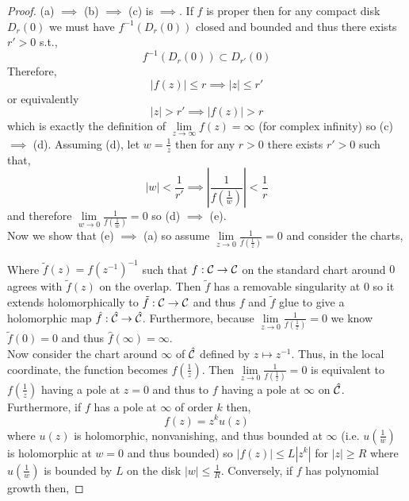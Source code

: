 \documentclass[12pt]{article}
\begin{document}
\begin{proof}
(a) $\implies$ (b) $\implies$ (c) is $\implies$. If $f$ is proper then for any compact disk $D_r(0)$ we must have $f^{-1}(D_r(0))$ closed and bounded and thus there exists $r' > 0$ s.t.,
\[ f^{-1}(D_r(0)) \subset D_{r'}(0) \]
Therefore,
\[ |f(z)| \le r \implies |z| \le r' \]
or equivalently
\[ |z| > r' \implies |f(z)| > r \]
which is exactly the definition of $\lim\limits_{z \to \infty} f(z) = \infty$ (for complex infinity) so (c) $\implies$ (d). Assuming (d), let $w = \frac{1}{z}$ then for any $r > 0$ there exists $r' > 0$ such that,
\[ \left| w \right| < \frac{1}{r'} \implies \left| \frac{1}{f(\frac{1}{w})} \right| < \frac{1}{r} \]
and therefore $\lim\limits_{w \to 0} \frac{1}{f(\frac{1}{w})} = 0$ so (d) $\implies$ (e).
\bigskip\\ 
Now we show that (e) $\implies$ (a) so assume $\lim\limits_{z \to 0} \frac{1}{f(\frac{1}{z})} = 0$ and consider the charts,
\begin{center}
\end{center}
Where $\tilde{f}(z) = f(z^{-1})^{-1}$ such that $f : \mathcal{C} \to \mathcal{C}$ on the standard chart around $0$ agrees with $\tilde{f}(z)$ on the overlap. Then $\tilde{f}$ has a removable singularity at $0$ so it extends holomorphically to $\tilde{f} : \mathcal{C} \to \mathcal{C}$ and thus $f$ and $\tilde{f}$ glue to give a holomorphic map $\hat{f} : \hat{\mathcal{C}} \to \hat{\mathcal{C}}$. Furthermore, because $\lim\limits_{z \to 0} \frac{1}{f(\frac{1}{z})} = 0$ we know $\tilde{f}(0) = 0$ and thus $\hat{f}(\infty) = \infty$. 
\bigskip\\
Now consider the chart around $\infty$ of $\hat{\mathcal{C}}$ defined by $z \mapsto z^{-1}$. Thus, in the local coordinate, the function becomes $f(\frac{1}{z})$. Then $\lim\limits_{z \to 0} \frac{1}{f(\frac{1}{z})} = 0$ is equivalent to  $f(\frac{1}{z})$ having a pole at $z = 0$ and thus to $f$ having a pole at $\infty$ on $\hat{\mathcal{C}}$. Furthermore, if $f$ has a pole at $\infty$ of order $k$ then,
\[ f(z) = z^k u(z) \]
where $u(z)$ is holomorphic, nonvanishing, and thus bounded at $\infty$ (i.e. $u(\frac{1}{w})$ is holomorphic at $w = 0$ and thus bounded) so $|f(z)| \le L |z^k|$ for $|z| \ge R$ where $u(\frac{1}{w})$ is bounded by $L$ on the disk $|w| \le \frac{1}{R}$. Conversely, if $f$ has polynomial growth then,

\end{proof}
\end{document}
